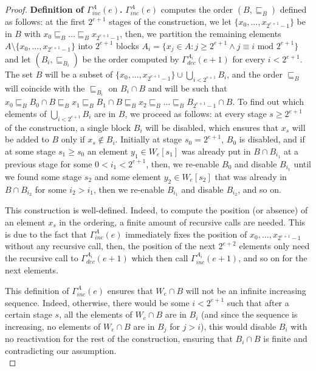 \documentclass[10pt,a4paper]{amsart}
\begin{document}
\begin{proof}
\textbf{Definition of $\Gamma^A_{inc}(e)$.}
$\Gamma^A_{inc}(e)$ computes the order $(B, \sqsubseteq_B)$ defined as follows: at the first $2^{e+1}$ stages of the construction, we let $\{x_0, \dots, x_{2^{e+1}-1}\}$ be in $B$ with $x_0 \sqsubseteq_B \dots \sqsubseteq_B x_{2^{e+1} - 1}$, then, we partition the remaining elements $A \setminus \{x_0, \dots, x_{2^{e+1} - 1}\}$ into $2^{e+1}$ blocks $A_i = \{x_j \in A : j \geq 2^{e+1} \wedge j \equiv i \mbox{ mod } 2^{e+1}\}$ and let $(B_i, \sqsubseteq_{B_i})$ be the order computed by $\Gamma^{A_i}_{dec}(e+1)$ for every $i < 2^{e+1}$. The set $B$ will be a subset of $\{x_0, \dots, x_{2^{e+1} - 1}\} \cup \bigcup_{i < 2^{e+1}} B_i$, and the order $\sqsubseteq_B$ will coincide with the $\sqsubseteq_{B_i}$ on $B_i \cap B$ and will be such that $x_0 \sqsubseteq_B B_0 \cap B \sqsubseteq_B x_1 \sqsubseteq_B B_1 \cap B \sqsubseteq_B x_2 \sqsubseteq_B \dots \sqsubseteq_B B_{2^{e+1} - 1} \cap B$. To find out which elements of $\bigcup_{i < 2^{e+1}} B_i$ are in $B$, we proceed as follows: at every stage $s \geq 2^{e+1}$ of the construction, a single block $B_i$ will be disabled, which ensures that $x_s$ will be added to $B$ only if $x_s \not\in B_i$. Initially at stage $s_0 = 2^{e+1}$, $B_0$ is disabled, and if at some stage $s_1 \geq s_0$ an element $y_1 \in W_e[s_1]$ was already put in $B \cap B_{i_1}$ at a previous stage for some $0 < i_1 < 2^{e+1}$, then, we re-enable $B_0$ and disable $B_{i_1}$ until we found some stage $s_2$ and some element $y_2 \in W_e[s_2]$ that was already in $B \cap B_{i_2}$ for some $i_2 > i_1$, then we re-enable $B_{i_1}$ and disable $B_{i_2}$, and so on. %

This construction is well-defined. Indeed, to compute the position (or absence) of an element $x_s$ in the ordering, a finite amount of recursive calls are needed. This is due to the fact that $\Gamma^A_{inc}(e)$ immediately fixes the position of $x_0, \dots, x_{2^{e+1} - 1}$ without any recursive call, then, the position of the next $2^{e+2}$ elements only need the recursive call to $\Gamma^{A_i}_{dec}(e+1)$ which then call $\Gamma^{A_i}_{inc}(e+1)$, and so on for the next elements. %

This definition of $\Gamma^A_{inc}(e)$ ensures that $W_e \cap B$ will not be an infinite increasing sequence. Indeed, otherwise, there would be some $i < 2^{e+1}$ such that after a certain stage $s$, all the elements of $W_e \cap B$ are in $B_i$ (and since the sequence is increasing, no elements of $W_e \cap B$ are in $B_j$ for $j > i$), this would disable $B_i$ with no reactivation for the rest of the construction, ensuring that $B_i \cap B$ is finite and contradicting our assumption. \\


\end{proof}
\end{document}
